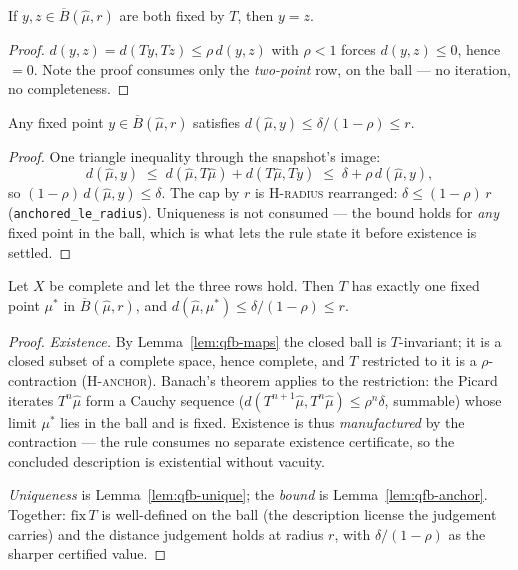 \begin{blemma}\label{lem:qfb-unique}
If $y, z \in \overline{B}(\hat\mu, r)$ are both fixed by $T$, then
$y = z$.
\end{blemma}
\begin{proof}
$d(y, z) = d(Ty, Tz) \leq \rho\, d(y, z)$ with $\rho < 1$ forces
$d(y, z) \leq 0$, hence $= 0$. Note the proof consumes only the
\emph{two-point} row, on the ball --- no iteration, no completeness.
\end{proof}

\begin{blemma}\label{lem:qfb-anchor}
Any fixed point $y \in \overline{B}(\hat\mu, r)$ satisfies
$d(\hat\mu, y) \leq \delta/(1 - \rho) \leq r$.
\end{blemma}
\begin{proof}
One triangle inequality through the snapshot's image:
\[
d(\hat\mu, y) \;\leq\; d(\hat\mu, T\hat\mu) + d(T\hat\mu, Ty)
\;\leq\; \delta + \rho\, d(\hat\mu, y),
\]
so $(1 - \rho)\, d(\hat\mu, y) \leq \delta$. The cap by $r$ is
H-\textsc{radius} rearranged: $\delta \leq (1 - \rho)\, r$
(\texttt{anchored\_le\_radius}). Uniqueness is not consumed --- the
bound holds for \emph{any} fixed point in the ball, which is what lets
the rule state it before existence is settled.
\end{proof}

\begin{bthm}\label{thm:qfb-sound}
Let $X$ be complete and let the three rows hold. Then $T$ has exactly
one fixed point $\mu^{*}$ in $\overline{B}(\hat\mu, r)$, and
$d(\hat\mu, \mu^{*}) \leq \delta/(1-\rho) \leq r$.
\end{bthm}
\begin{proof}
\emph{Existence.} By Lemma~\ref{lem:qfb-maps} the closed ball is
$T$-invariant; it is a closed subset of a complete space, hence
complete, and $T$ restricted to it is a $\rho$-contraction
(H-\textsc{anchor}). Banach's theorem \cite{banach1922} applies to the
restriction: the Picard iterates $T^n \hat\mu$ form a Cauchy sequence
($d(T^{n+1}\hat\mu, T^n\hat\mu) \leq \rho^n \delta$, summable) whose
limit $\mu^{*}$ lies in the ball and is fixed. Existence is thus
\emph{manufactured} by the contraction --- the rule consumes no
separate existence certificate, so the concluded description is
existential without vacuity.

\emph{Uniqueness} is Lemma~\ref{lem:qfb-unique}; the \emph{bound} is
Lemma~\ref{lem:qfb-anchor}. Together: $\mathrm{fix}\,T$ is well-defined
on the ball (the description license the judgement carries) and the
distance judgement holds at radius $r$, with $\delta/(1-\rho)$ as the
sharper certified value.
\end{proof}

